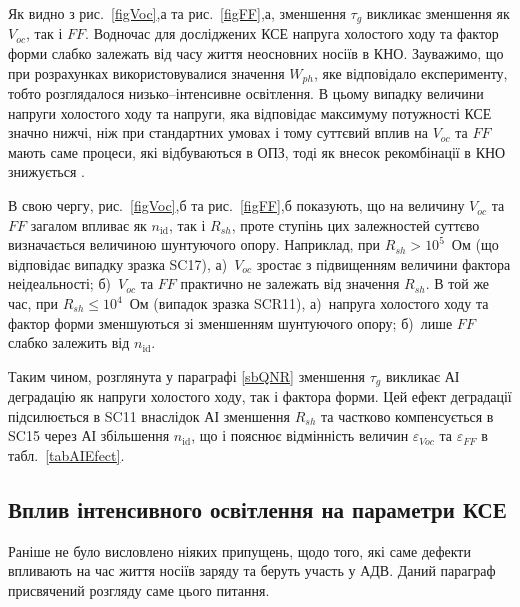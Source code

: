 Як видно з рис.~\ref{figVoc},а та рис.~\ref{figFF},а, зменшення $\tau_g$ викликає зменшення як $V_{oc}$, так і $F\!F$.
Водночас для досліджених КСЕ напруга холостого ходу та фактор форми слабко залежать від
часу життя неосновних носіїв в КНО.
Зауважимо, що при розрахунках використовувалися значення $W_{ph}$, яке відповідало експерименту,
тобто розглядалося низько--інтенсивне освітлення.
В цьому випадку величини напруги холостого ходу та напруги, яка відповідає максимуму потужності КСЕ значно нижчі,
ніж при стандартних умовах і тому суттєвий вплив на $V_{oc}$ та $F\!F$ мають саме процеси, які відбуваються
в ОПЗ, тоді як внесок рекомбінації в КНО знижується \cite{Breitenstein2013}.

В свою чергу, рис.~\ref{figVoc},б та рис.~\ref{figFF},б показують,
що на величину $V_{oc}$ та $F\!F$ загалом впливає як $n_\mathrm{id}$, так і $R_{sh}$,
проте ступінь цих залежностей суттєво визначається величиною шунтуючого опору.
Наприклад, при $R_{sh}>10^5$~Ом (що відповідає випадку зразка SC17),
а)~$V_{oc}$ зростає з підвищенням величини фактора неідеальності;
б)~$V_{oc}$ та $FF$ практично не залежать від значення $R_{sh}$.
В той же час, при $R_{sh}\leq10^4$~Ом (випадок зразка SCR11),
а)~напруга холостого ходу та фактор форми зменшуються зі зменшенням шунтуючого опору;
б)~лише $F\!F$ слабко залежить від $n_\mathrm{id}$.

Таким чином, розглянута у параграфі \ref{sbQNR} зменшення $\tau_g$ викликає АІ деградацію як напруги
холостого ходу, так і фактора форми.
Цей ефект деградації підсилюється в SC11 внаслідок АІ зменшення $R_{sh}$ та частково компенсується в SC15
через АІ збільшення $n_\mathrm{id}$, що і пояснює відмінність величин $\varepsilon_{Voc}$ та $\varepsilon_{FF}$ в табл.~\ref{tabAIEfect}.




\subsection{Вплив інтенсивного освітлення на параметри КСЕ\label{sbDefectType}}
Раніше не було висловлено ніяких припущень, щодо того, які саме дефекти впливають на час життя
носіїв заряду та беруть участь у АДВ.
Даний параграф присвячений розгляду саме цього питання.

